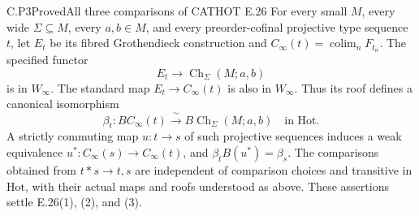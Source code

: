 \begin{result}{C.P3}{Proved}{All three comparisons of CATHOT E.26}
For every small $M$, every wide $\Sigma\subseteq M$, every $a,b\in M$, and every preorder-cofinal projective type sequence $t$, let $E_t$ be its fibred Grothendieck construction and $C_\infty(t)=\operatorname*{colim}_n F_{t_n}$. The specified functor
\[
 E_t\longrightarrow\operatorname{Ch}_\Sigma(M;a,b)
\]
is in $W_\infty$. The standard map $E_t\to C_\infty(t)$ is also in $W_\infty$. Thus its roof defines a canonical isomorphism
\[
 \beta_t:BC_\infty(t)\xrightarrow{\ \sim\ }
 B\operatorname{Ch}_\Sigma(M;a,b)\quad\text{in }\mathrm{Hot}.
\]
A strictly commuting map $u:t\to s$ of such projective sequences induces a weak equivalence $u^*:C_\infty(s)\to C_\infty(t)$, and
$\beta_t B(u^*)=\beta_s$. The comparisons obtained from $t*s\to t,s$ are independent of comparison choices and transitive in $\mathrm{Hot}$, with their actual maps and roofs understood as above. These assertions settle E.26(1), (2), and (3).
\end{result}
